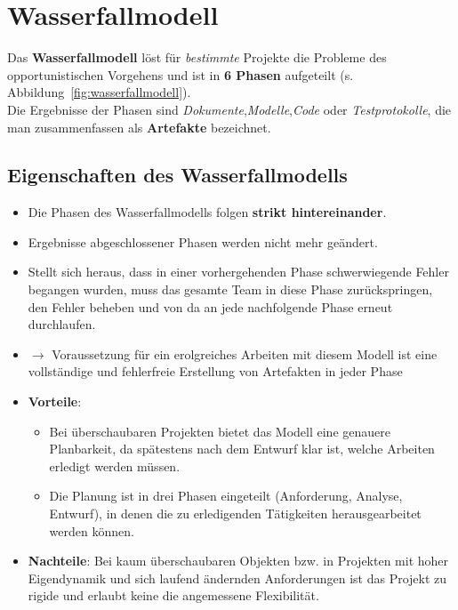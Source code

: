 \section{Wasserfallmodell}

Das \textbf{Wasserfallmodell} löst für \textit{bestimmte} Projekte die Probleme des opportunistischen Vorgehens und ist in \textbf{6 Phasen} aufgeteilt (s. Abbildung~\ref{fig:wasserfallmodell}).\\
Die Ergebnisse der Phasen sind \textit{Dokumente},\textit{Modelle},\textit{Code} oder \textit{Testprotokolle}, die man zusammenfassen als \textbf{Artefakte} bezeichnet.\\

\subsection*{Eigenschaften des Wasserfallmodells}
\begin{itemize}
    \item Die Phasen des Wasserfallmodells folgen \textbf{strikt hintereinander}.
    \item Ergebnisse abgeschlossener Phasen werden nicht mehr geändert.
    \item Stellt sich heraus, dass in einer vorhergehenden Phase schwerwiegende Fehler begangen wurden, muss das gesamte Team in diese Phase zurückspringen, den Fehler beheben und von da an jede nachfolgende Phase erneut durchlaufen.
    \item[] $\rightarrow$ Voraussetzung für ein erolgreiches Arbeiten mit diesem Modell ist eine vollständige und fehlerfreie Erstellung von Artefakten in jeder Phase
    \item \textbf{Vorteile}:
        \begin{itemize}
            \item Bei überschaubaren Projekten bietet das Modell eine genauere Planbarkeit, da spätestens nach dem Entwurf klar ist, welche Arbeiten erledigt werden müssen.
            \item Die Planung ist in drei Phasen eingeteilt (Anforderung, Analyse, Entwurf), in denen die zu erledigenden Tätigkeiten herausgearbeitet werden können.
        \end{itemize}
    \item \textbf{Nachteile}: Bei kaum überschaubaren Objekten bzw. in Projekten mit hoher Eigendynamik und sich laufend ändernden Anforderungen ist das Projekt zu rigide und erlaubt keine die angemessene Flexibilität.
\end{itemize}



